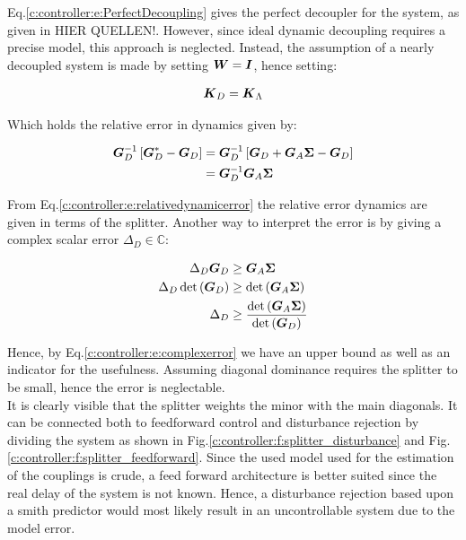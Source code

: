Eq.\ref{c:controller:e:PerfectDecoupling} gives the perfect decoupler for the system, as given in HIER QUELLEN!. However, since ideal dynamic decoupling requires a precise model, this approach is neglected. Instead, the assumption of a nearly decoupled system is made by setting $\mbox{\boldmath$W$}=\mbox{\boldmath$I$}$, hence setting:

\begin{align}
\mbox{\boldmath$K$}_D = \mbox{\boldmath$K$}_{\Lambda}
\end{align} 

Which holds the relative error in dynamics given by:

\begin{align}
\begin{split}
\mbox{\boldmath$G$}_D^{-1}\left[\mbox{\boldmath$G$}_D^*- \mbox{\boldmath$G$}_D\right] &= \mbox{\boldmath$G$}_D^{-1}\left[\mbox{\boldmath$G$}_D + \mbox{\boldmath$G$}_A \mbox{\boldmath$\Sigma$} - \mbox{\boldmath$G$}_D \right]\\
&= \mbox{\boldmath$G$}_D^{-1}\mbox{\boldmath$G$}_A \mbox{\boldmath$\Sigma$} 
\end{split}
\label{c:controller:e:relativedynamicerror}
\end{align}

From Eq.\ref{c:controller:e:relativedynamicerror} the relative error dynamics are given in terms of the splitter. Another way to interpret the error is by giving a complex scalar error $\Delta_D \in \mathbb{C}$:

\begin{align}
\begin{split}
\Delta_D \mbox{\boldmath$G$}_D &\geq   \mbox{\boldmath$G$}_A \mbox{\boldmath$\Sigma$} \\
\Delta_D \det\left( \mbox{\boldmath$G$}_D \right) &\geq \det\left( \mbox{\boldmath$G$}_A \mbox{\boldmath$\Sigma$} \right) \\
\Delta_D &\geq \frac{\det\left( \mbox{\boldmath$G$}_A \mbox{\boldmath$\Sigma$} \right) }{\det\left( \mbox{\boldmath$G$}_D \right)}
\end{split}
\label{c:controller:e:complexerror}
\end{align}

Hence, by Eq.\ref{c:controller:e:complexerror} we have an upper bound as well as an indicator for the usefulness. Assuming diagonal dominance requires the splitter to be small, hence the error is neglectable.\\

It is clearly visible that the splitter weights the minor with the main diagonals. It can be connected both to feedforward control and disturbance rejection by dividing the system as shown in Fig.\ref{c:controller:f:splitter_disturbance} and Fig.\ref{c:controller:f:splitter_feedforward}. Since the used model used for the estimation of the couplings is crude, a feed forward architecture is better suited since the real delay of the system is not known. Hence, a disturbance rejection based upon a smith predictor would most likely result in an uncontrollable system due to the model error.\\


